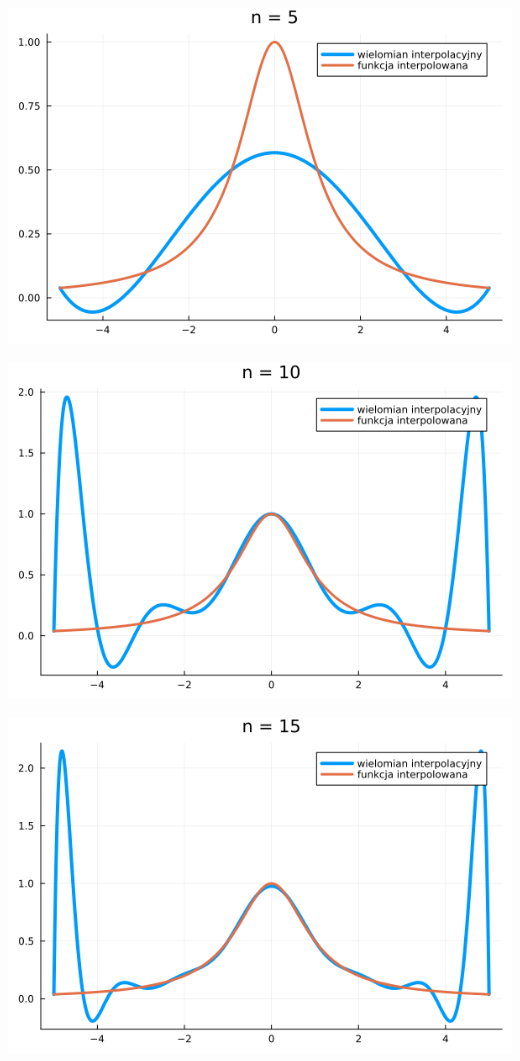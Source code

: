 \documentclass{article}
\begin{document}
\begin{center}
    \includegraphics[scale=0.33]{6b_5.png}
\end{center}
\begin{center}
    \includegraphics[scale=0.33]{6b_10.png}
\end{center}
\begin{center}
    \includegraphics[scale=0.33]{6b_15.png}
\end{center}
\end{document}
